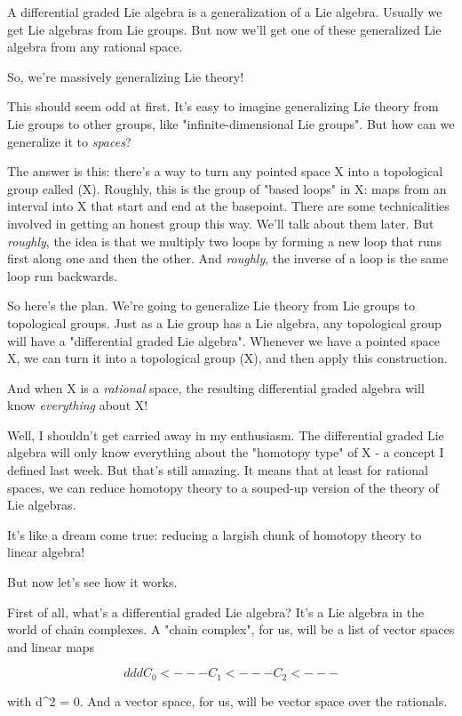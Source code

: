 A differential graded Lie algebra is a generalization of a Lie
algebra.  Usually we get Lie algebras from Lie groups.  But now
we'll get one of these generalized Lie algebra from any rational
space.  

So, we're massively generalizing Lie theory!

This should seem odd at first.  It's easy to imagine generalizing Lie
theory from Lie groups to other groups, like "infinite-dimensional Lie
groups".  But how can we generalize it to \emph{spaces}?

The answer is this: there's a way to turn any pointed space X into a
topological group called \Omega (X).  Roughly, this is the group of
"based loops" in X: maps from an interval into X that start
and end at the basepoint.  There are some technicalities involved in
getting an honest group this way.  We'll talk about them later.  But
\emph{roughly}, the idea is that we multiply two loops by forming a new
loop that runs first along one and then the other.  And \emph{roughly},
the inverse of a loop is the same loop run backwards.

So here's the plan.  We're going to generalize Lie theory from Lie
groups to topological groups.  Just as a Lie group has a Lie algebra,
any topological group will have a "differential graded Lie algebra".
Whenever we have a pointed space X, we can turn it into a topological
group \Omega (X), and then apply this construction.

And when X is a \emph{rational} space, the resulting differential graded
algebra will know \emph{everything} about X!

Well, I shouldn't get carried away in my enthusiasm.  The differential
graded Lie algebra will only know everything about the "homotopy
type" of X - a concept I defined last week.  But that's still
amazing.  It means that at least for rational spaces, we can reduce
homotopy theory to a souped-up version of the theory of Lie algebras.

It's like a dream come true: reducing a largish chunk of homotopy
theory to linear algebra!

But now let's see how it works.

First of all, what's a differential graded Lie algebra?  It's a 
Lie algebra in the world of chain complexes.   A "chain complex",
for us, will be a list of vector spaces and linear maps

$$
     d       d      d
C_{0} <--- C_{1} <--- C_{2} <---
$$
    

with d^{2} = 0.  And a vector space, for us, will be vector
space over the rationals.

